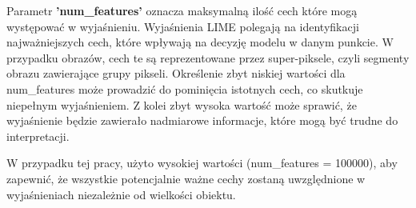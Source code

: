Parametr \textbf{'num\_features'} oznacza maksymalną ilość cech które mogą występować w wyjaśnieniu.
Wyjaśnienia LIME polegają na identyfikacji najważniejszych cech, które wpływają na decyzję modelu w danym punkcie.
W przypadku obrazów, cech te są reprezentowane przez super-piksele, czyli segmenty obrazu zawierające grupy pikseli.
Określenie zbyt niskiej wartości dla num\_features może prowadzić do pominięcia istotnych cech, co skutkuje niepełnym wyjaśnieniem.
Z kolei zbyt wysoka wartość może sprawić, że wyjaśnienie będzie zawierało nadmiarowe informacje, które mogą być trudne do interpretacji.

W przypadku tej pracy, użyto wysokiej wartości (num\_features = 100000), aby zapewnić, że wszystkie potencjalnie ważne cechy zostaną uwzględnione w wyjaśnieniach niezależnie od wielkości obiektu.

